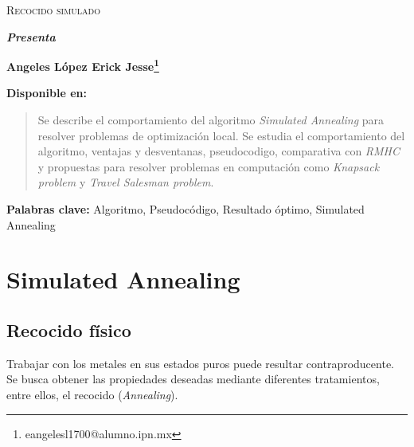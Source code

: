 \documentclass[12pt,twoside]{article}
\newcommand{\keywords}[1]{%
	\begin{center}
		\textbf{Palabras clave:} #1
	\end{center}
}
\begin{document}
	\centerline{}
	
	
	
	\begin{center}
		\Large{\textsc{Recocido simulado}} 
	\end{center}
	\centerline{}
	\centerline{\bf {\textit{Presenta}}}
	\centerline{}
	\centerline{\bf {Angeles López Erick Jesse\footnote{eangelesl1700@alumno.ipn.mx}}}
	\centerline{}
	\centerline{}
	\centerline{\bf {Disponible en:}}
	\centerline{}
	
	
	
	\newtheorem{Theorem}{\quad Theorem}[section]
	
	\newtheorem{Definition}[Theorem]{\quad Definition}
	
	\newtheorem{Corollary}[Theorem]{\quad Corollary}
	
	\newtheorem{Lemma}[Theorem]{\quad Lemma}
	
	\newtheorem{Example}[Theorem]{\quad Example}
	
	\bigskip
	
	\bigskip
	
	\begin{abstract} 
		Se describe el comportamiento del algoritmo \textit{Simulated Annealing} para resolver problemas de optimización local. Se estudia el comportamiento del algoritmo, ventajas y desventanas, pseudocodigo, comparativa con \textit{RMHC} y propuestas para resolver problemas en computación como \textit{Knapsack problem} y \textit{Travel Salesman problem}.
	\end{abstract}
	
	\keywords{Algoritmo, Pseudocódigo, Resultado óptimo, Simulated Annealing}
	
	\clearpage
	
	\tableofcontents
	\clearpage
		
	\section{Simulated Annealing}

	\subsection{Recocido físico}

	Trabajar con los metales en sus estados puros puede resultar contraproducente. Se busca obtener las propiedades deseadas mediante diferentes tratamientos, entre ellos, el recocido (\textit{Annealing}).
	
\end{document}
